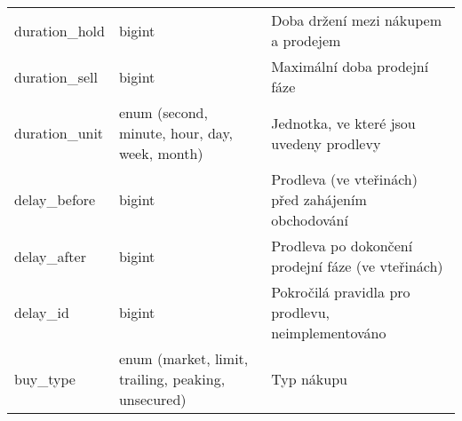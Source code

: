 \begin{center}
\begin{longtable}[h]{|l|C{4cm}|p{4cm}|}
        duration\_hold                        & bigint                                                                                                                                                           & Doba držení mezi nákupem a prodejem                                                                                               \\
        duration\_sell                        & bigint                                                                                                                                                           & Maximální doba prodejní fáze                                                                                                      \\
        duration\_unit                        & enum (second, minute, hour, day, week, month)                                                                                                                    & Jednotka, ve které jsou uvedeny prodlevy                                                                                          \\
        delay\_before                         & bigint                                                                                                                                                           & Prodleva (ve vteřinách) před zahájením obchodování                                                                                \\
        delay\_after                          & bigint                                                                                                                                                           & Prodleva po dokončení prodejní fáze (ve vteřinách)                                                                                \\
        delay\_id                             & bigint                                                                                                                                                           & Pokročilá pravidla pro prodlevu, neimplementováno                                                                                 \\
        buy\_type                             & enum (market, limit, trailing, peaking, unsecured)                                                                                                               & Typ nákupu                                                                                                                        \\

\end{longtable}
\end{center}
